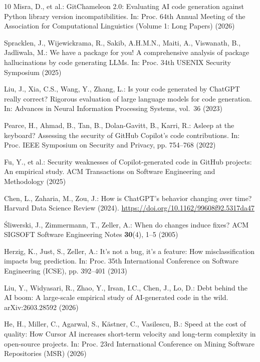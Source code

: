 \documentclass[runningheads]{llncs}
\begin{document}
\begin{thebibliography}{10}
Misra, D., et al.: GitChameleon 2.0: Evaluating AI code generation against Python library version incompatibilities. In: Proc. 64th Annual Meeting of the Association for Computational Linguistics (Volume 1: Long Papers) (2026)

Spracklen, J., Wijewickrama, R., Sakib, A.H.M.N., Maiti, A., Viswanath, B., Jadliwala, M.: We have a package for you! A comprehensive analysis of package hallucinations by code generating LLMs. In: Proc. 34th USENIX Security Symposium (2025)

Liu, J., Xia, C.S., Wang, Y., Zhang, L.: Is your code generated by ChatGPT really correct? Rigorous evaluation of large language models for code generation. In: Advances in Neural Information Processing Systems, vol.~36 (2023)

Pearce, H., Ahmad, B., Tan, B., Dolan-Gavitt, B., Karri, R.: Asleep at the keyboard? Assessing the security of GitHub Copilot's code contributions. In: Proc. IEEE Symposium on Security and Privacy, pp. 754--768 (2022)

Fu, Y., et al.: Security weaknesses of Copilot-generated code in GitHub projects: An empirical study. ACM Transactions on Software Engineering and Methodology (2025)

Chen, L., Zaharia, M., Zou, J.: How is ChatGPT's behavior changing over time? Harvard Data Science Review (2024). \url{https://doi.org/10.1162/99608f92.5317da47}

\'Sliwerski, J., Zimmermann, T., Zeller, A.: When do changes induce fixes? ACM SIGSOFT Software Engineering Notes \textbf{30}(4), 1--5 (2005)

Herzig, K., Just, S., Zeller, A.: It's not a bug, it's a feature: How misclassification impacts bug prediction. In: Proc. 35th International Conference on Software Engineering (ICSE), pp. 392--401 (2013)

Liu, Y., Widyasari, R., Zhao, Y., Irsan, I.C., Chen, J., Lo, D.: Debt behind the AI boom: A large-scale empirical study of AI-generated code in the wild. arXiv:2603.28592 (2026)

He, H., Miller, C., Agarwal, S., K\"astner, C., Vasilescu, B.: Speed at the cost of quality: How Cursor AI increases short-term velocity and long-term complexity in open-source projects. In: Proc. 23rd International Conference on Mining Software Repositories (MSR) (2026)


\end{thebibliography}
\end{document}
